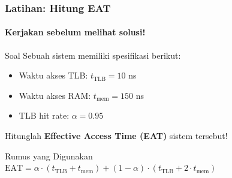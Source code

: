 \documentclass[t,aspectratio=169,xcolor=dvipsnames]{beamer}
\begin{document}
\begin{frame}
    \frametitle{Latihan: Hitung EAT}
    \framesubtitle{Kerjakan sebelum melihat solusi!}
    \small

    \begin{block}{Soal}
        Sebuah sistem memiliki spesifikasi berikut:
        \begin{itemize}
            \item Waktu akses TLB: $t_{\text{TLB}} = 10$ ns
            \item Waktu akses RAM: $t_{\text{mem}} = 150$ ns
            \item TLB hit rate: $\alpha = 0.95$
        \end{itemize}
        Hitunglah \textbf{Effective Access Time (EAT)} sistem tersebut!
    \end{block}

    \vspace{0.2cm}
    \begin{alertblock}{Rumus yang Digunakan}
        \centering
        $\text{EAT} = \alpha \cdot (t_{\text{TLB}} + t_{\text{mem}}) + (1-\alpha) \cdot (t_{\text{TLB}} + 2 \cdot t_{\text{mem}})$
    \end{alertblock}
\end{frame}
\end{document}
